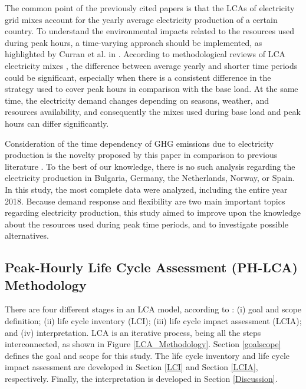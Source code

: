 {The common point of the previously cited papers is that the LCAs of electricity grid mixes account for the yearly average electricity production of a certain country. To understand  the environmental impacts related to the resources used during peak hours, a time-varying approach should be implemented, as highlighted by Curran et al. in \cite{CURRAN2005}.} 
{According to methodological reviews of LCA electricity mixes \cite{Soimakallio2011,Turconi2013LifeLimitations}, the difference between average yearly and shorter time periods could be significant, especially when there is a consistent difference in the strategy used to cover peak hours in comparison with the base load. At the same time, the electricity demand changes depending on seasons, weather, and resources availability, and consequently the mixes used  during base load and peak hours can differ significantly.}

{Consideration of the time dependency of GHG emissions due to electricity production is the novelty proposed by this paper in comparison to previous literature \cite{Garcia-Gusano2017, Lund2010EnergyLCA, Jones2017AnGeneration, Thomson2017MarginalBritain, Howard2017CurrentCity, Garcia2014, Garcia2016MarginalVehicles, Moro2017}}. To the best of our knowledge, there is no such analysis regarding the electricity production in Bulgaria, Germany, the Netherlands, Norway, or Spain. In this study, the most complete data were analyzed, including the entire year 2018. Because demand response and flexibility are two main important topics regarding electricity production, this study aimed to improve upon the knowledge about the resources used during peak time periods, and to investigate possible alternatives. 

\subsection{Peak-Hourly Life Cycle Assessment (PH-LCA) Methodology}


{There are four different stages in an LCA model, according to \cite{2006ISOGuidelines, 2006ISOFramework}: (i) goal and scope definition; (ii) life cycle inventory (LCI); (iii) life cycle impact assessment (LCIA); and (iv) interpretation. LCA is an iterative process, being all the steps interconnected, as shown in Figure \ref{LCA_Methodology}.}
{Section \ref{goalscope} defines the goal and scope for this study.} The life cycle inventory and life cycle impact assessment are developed in Section \ref{LCI} and Section \ref{LCIA}, respectively. {Finally, the interpretation is developed in Section \ref{Discussion}}.

